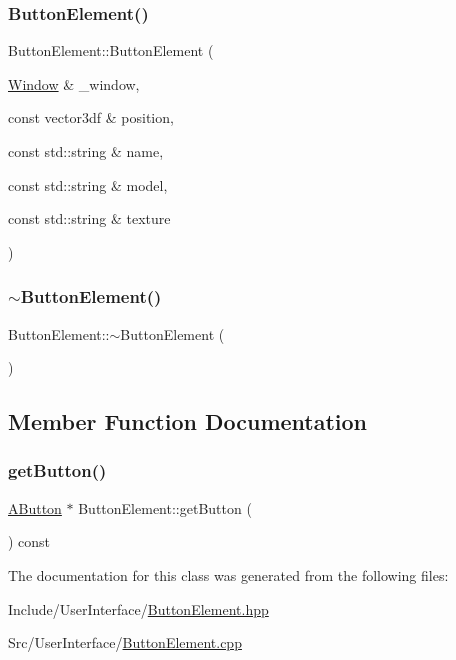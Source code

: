 \subsubsection{\texorpdfstring{ButtonElement()}{ButtonElement()}}
{\footnotesize\ttfamily Button\+Element\+::\+Button\+Element (\begin{DoxyParamCaption}\item[{\mbox{\hyperlink{class_window}{Window}} \&}]{\+\_\+window,  }\item[{const vector3df \&}]{position,  }\item[{const std\+::string \&}]{name,  }\item[{const std\+::string \&}]{model,  }\item[{const std\+::string \&}]{texture }\end{DoxyParamCaption})}

\mbox{\label{class_button_element_ac2cffdd95b10d224d5a9f37c121fe93d}} 
\subsubsection{\texorpdfstring{$\sim$ButtonElement()}{~ButtonElement()}}
{\footnotesize\ttfamily Button\+Element\+::$\sim$\+Button\+Element (\begin{DoxyParamCaption}{ }\end{DoxyParamCaption})\hspace{0.3cm}{\ttfamily [default]}}



\subsection{Member Function Documentation}
\mbox{\label{class_button_element_a3729f951afa3d2a970e7517ac2ed5e43}} 
\subsubsection{\texorpdfstring{getButton()}{getButton()}}
{\footnotesize\ttfamily \mbox{\hyperlink{class_a_button}{A\+Button}} $\ast$ Button\+Element\+::get\+Button (\begin{DoxyParamCaption}{ }\end{DoxyParamCaption}) const}



The documentation for this class was generated from the following files\+:\begin{DoxyCompactItemize}
\item 
Include/\+User\+Interface/\mbox{\hyperlink{_button_element_8hpp}{Button\+Element.\+hpp}}\item 
Src/\+User\+Interface/\mbox{\hyperlink{_button_element_8cpp}{Button\+Element.\+cpp}}\end{DoxyCompactItemize}
